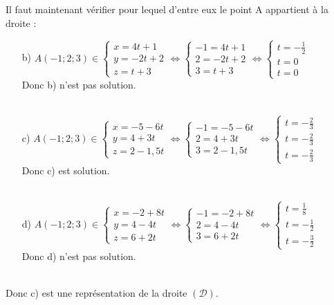 \documentclass[a4paper, 12pt]{article}
\begin{document}
\noindent
Il faut maintenant vérifier pour lequel d'entre eux le point A appartient à la droite :
\vspace{3mm}
\begin{itemize}
    \item[b)] $A(-1; 2; 3) \in \begin{cases} x = 4t + 1 \\ y = -2t + 2 \\ z = t + 3 \end{cases} 
        \iff \begin{cases} -1 = 4t + 1\\ 2 = -2t + 2\\ 3 = t + 3\end{cases} 
        \iff \begin{cases} t = -\frac{1}{2} \\ t = 0 \\ t = 0\end{cases}$
        \\ Donc b) n'est pas solution. \\ \\

    \item[c)] $A(-1; 2; 3) \in \begin{cases} x = -5 - 6t \\ y = 4 + 3t \\ z = 2 - 1,5t \end{cases} 
        \iff \begin{cases} -1 = -5 -6t\\ 2 = 4 + 3t \\ 3 = 2 - 1,5t\end{cases} 
        \iff \begin{cases} t = -\frac{2}{3} \\ t = -\frac{2}{3} \\ t = - \frac{2}{3} \end{cases}$
        \\ Donc c) est solution. \\ \\

    \item[d)] $A(-1; 2; 3) \in \begin{cases} x = -2 + 8t \\ y = 4 - 4t \\ z = 6 + 2t \end{cases} 
        \iff \begin{cases} -1 = -2 +8t \\ 2 = 4 - 4t\\ 3 = 6 + 2t\end{cases} 
        \iff \begin{cases} t = \frac{1}{8} \\ t = -\frac{1}{2} \\ t = -\frac{3}{2} \end{cases}$
        \\ Donc d) n'est pas solution. \\ \\

\end{itemize}
Donc c) est une représentation de la droite $(\mathcal{D})$.
\end{document}
